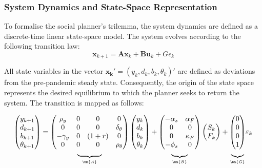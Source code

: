 \subsubsection{System Dynamics and State-Space Representation}

To formalise the social planner’s trilemma, the system dynamics are defined as a discrete-time linear state-space model. The system evolves according to the following transition law:
\begin{equation}
    \bm{x}_{k+1} = \bm{A} \bm{x}_k + \bm{B} \bm{u}_k +  G\epsilon_k
\end{equation}

\noindent All state variables in the vector $\bm{{x}_k}' = (y_k, d_k, b_k, \theta_k)'$ are defined as deviations from the pre-pandemic steady state. Consequently, the origin of the state space represents the desired equilibrium to which the planner seeks to return the system. The transition is mapped as follows:

\begin{equation}
\begin{pmatrix} y_{k+1} \\ d_{k+1} \\ b_{k+1} \\ \theta_{k+1} \end{pmatrix} = 
\underset{\underbrace{\rule{1.2cm}{0pt}}_{\bm{A}}}{
\begin{pmatrix} 
\rho_y & 0 & 0 & 0 \\ 
0 & 0 & 0 & \delta_\theta \\ 
-\gamma_y & 0 & (1+r) & 0 \\ 
0 & 0 & 0 & \rho_\theta 
\end{pmatrix}}
\begin{pmatrix} y_k \\ d_k \\ b_k \\ \theta_k \end{pmatrix} +
\underset{\underbrace{\rule{0.8cm}{0pt}}_{\bm{B}}}{
\begin{pmatrix} 
-\alpha_s & \alpha_F \\ 
0 & 0 \\ 
0 & \kappa_F \\ 
-\phi_s & 0 
\end{pmatrix}}
\begin{pmatrix} S_k \\ F_k \end{pmatrix} + 
\underset{\underbrace{\rule{0.5cm}{0pt}}_{\bm{G}}}{
\begin{pmatrix} 0 \\ 0 \\ 0 \\ 1 \end{pmatrix}} 
\varepsilon_k
\end{equation}

